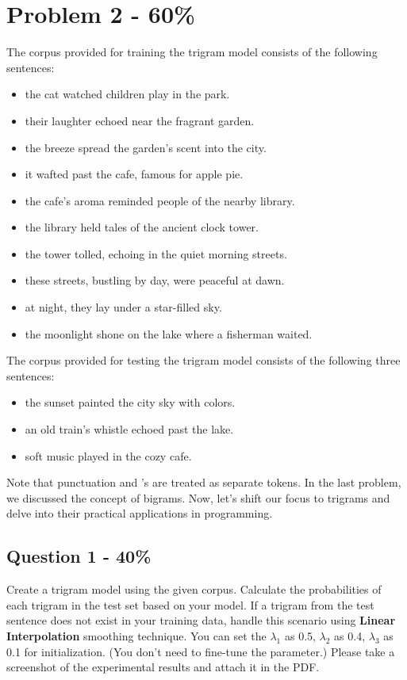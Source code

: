 \documentclass{article}
\begin{document}
\section*{Problem 2 - 60\%}
The corpus provided for training the trigram model consists of the 
following sentences:

\begin{itemize}
    \item the cat watched children play in the park.
    \item their laughter echoed near the fragrant garden.
    \item the breeze spread the garden's scent into the city.
    \item it wafted past the cafe, famous for apple pie.
    \item the cafe's aroma reminded people of the nearby library.
    \item the library held tales of the ancient clock tower.
    \item the tower tolled, echoing in the quiet morning streets.
    \item these streets, bustling by day, were peaceful at dawn.
    \item at night, they lay under a star-filled sky.
    \item the moonlight shone on the lake where a fisherman waited.
\end{itemize}

The corpus provided for testing the trigram model consists of the following 
three sentences:

\begin{itemize}
    \item the sunset painted the city sky with colors.
    \item an old train's whistle echoed past the lake.
    \item soft music played in the cozy cafe.
\end{itemize}

Note that punctuation and 's are treated as separate tokens.
In the last problem, we discussed the concept of bigrams. Now, let's shift our focus to trigrams and delve into their practical applications in programming.

\subsection*{Question 1 - 40\%}
Create a trigram model using the given corpus. Calculate the probabilities 
of each trigram in the test set based on your model.
If a trigram from the test sentence does not exist in your training data, handle this scenario using \textbf{Linear Interpolation} smoothing technique.
You can set the $\lambda_1$ as 0.5, $\lambda_2$ as 0.4, $\lambda_3$ as 0.1 for initialization. (You don't need to fine-tune the parameter.) Please take a screenshot of the experimental results and attach it in the PDF.
\end{document}
